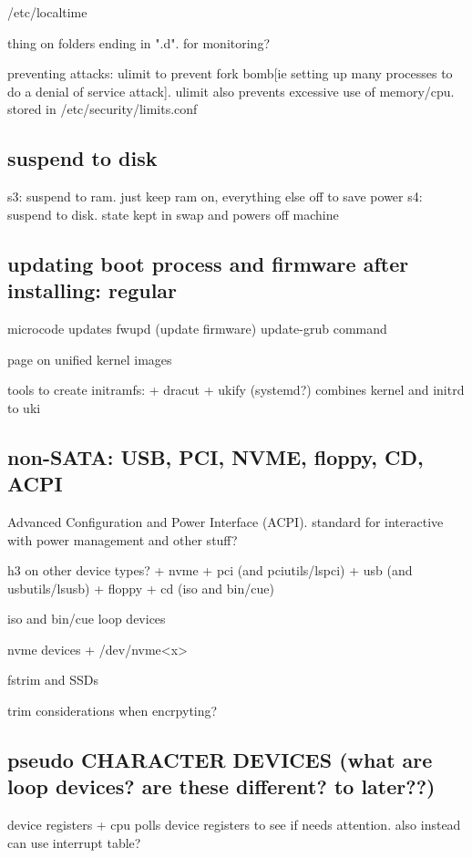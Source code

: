 /etc/localtime

thing on folders ending in ".d". for monitoring?

preventing attacks: ulimit to prevent fork bomb[ie setting up many processes to do a denial of service attack]. ulimit also prevents excessive use of memory/cpu. stored in /etc/security/limits.conf

\subsection{suspend to disk}

s3: suspend to ram. just keep ram on, everything else off to save power
s4: suspend to disk. state kept in swap and powers off machine

\subsection{updating boot process and firmware after installing: regular}

microcode updates
fwupd (update firmware)
update-grub command

page on unified kernel images

tools to create initramfs:
+ dracut
+ ukify (systemd?) combines kernel and initrd to uki

\subsection{non-SATA: USB, PCI, NVME, floppy, CD, ACPI}

Advanced Configuration and Power Interface (ACPI). standard for interactive with power management and other stuff?

h3 on other device types?
+ nvme
+ pci (and pciutils/lspci)
+ usb (and usbutils/lsusb)
+ floppy
+ cd (iso and bin/cue)



iso and bin/cue
loop devices

nvme devices
+ /dev/nvme<x>

fstrim and SSDs

trim considerations when encrpyting?

\subsection{pseudo CHARACTER DEVICES (what are loop devices? are these different? to later??)}

device registers
+ cpu polls device registers to see if needs attention. also instead can use interrupt table?

